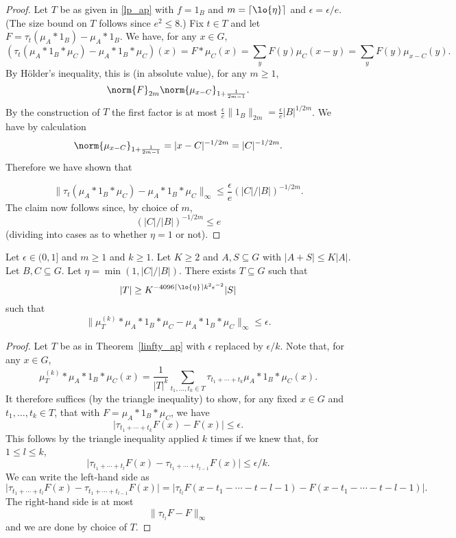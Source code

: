 \begin{proof}
 Let $T$ be as given in \ref{lp_ap}
with $f=1_B$ and $m=\lceil \lo{\eta}\rceil$ and $\epsilon=\epsilon/e$. (The size bound on $T$ follows since $e^2\leq 8$.) Fix $t\in T$ and let $F=\tau_t(\mu_A\ast 1_B)-\mu_A\ast 1_B$. We have, for any $x\in G$,
\[(\tau_t(\mu_A\ast 1_B\ast \mu_C)-\mu_A\ast 1_B\ast \mu_C)(x)=F\ast \mu_C(x)=\sum_y F(y)\mu_{C}(x-y)=\sum_yF(y)\mu_{x-C}(y).\]
By Hölder's inequality, this is (in absolute value), for any $m\geq 1$,
\[\norm{F}_{2m}\norm{\mu_{x-C}}_{1+\frac{1}{2m-1}}.\]
By the construction of $T$ the first factor is at most
$\frac{\epsilon}{e}\| 1_B\|_{2m}=\frac{\epsilon}{e}\lvert B\rvert^{1/2m}$.
We have by calculation
\[\norm{\mu_{x-C}}_{1+\frac{1}{2m-1}}=\lvert x-C\rvert^{-1/2m}=\lvert C\rvert^{-1/2m}.\]
Therefore we have shown that

\[\| \tau_t(\mu_A\ast 1_B\ast \mu_C)-\mu_A\ast 1_B\ast \mu_C\|_{\infty}\leq \frac{\epsilon}{e}(\lvert C\rvert/\lvert B\rvert)^{-1/2m}.\]
The claim now follows since, by choice of $m$,
\[(\lvert C\rvert/\lvert B\rvert)^{-1/2m}\leq e\]
(dividing into cases as to whether $\eta=1$ or not).
\end{proof}


\begin{theorem}
\label{linfty_ap_boosted}

Let $\epsilon\in (0,1]$ and $m\geq 1$ and $k\geq 1$. Let $K\geq 2$ and $A,S\subseteq G$ with $\lvert A+S\rvert\leq K\lvert A\rvert$.
Let $B,C\subseteq G$. Let $\eta=\min(1,\lvert C\rvert/\lvert B\rvert)$. There exists $T\subseteq G$ such that
\[\lvert T\rvert \geq K^{-4096\lceil \lo{\eta}\rceil k^2\epsilon^{-2}}\lvert S\rvert\]
such that
\[\| \mu_T^{(k)}\ast \mu_A\ast 1_B\ast \mu_C-\mu_A\ast 1_B\ast \mu_C\|_{\infty}\leq \epsilon.\]
\end{theorem}

\begin{proof}
Let $T$ be as in Theorem~\ref{linfty_ap} with $\epsilon$ replaced by $\epsilon/k$. Note that, for any $x\in G$,
\[\mu_T^{(k)}\ast \mu_A\ast 1_B\ast \mu_C(x)=\frac{1}{\lvert T\rvert^k}\sum_{t_1,\ldots,t_k\in T}\tau_{t_1+\cdots+t_k}\mu_A\ast 1_B\ast \mu_C(x).\]
It therefore suffices (by the triangle inequality) to show, for any fixed $x\in G$ and $t_1,\ldots,t_k\in T$, that with $F=\mu_A\ast 1_B\ast \mu_C$, we have
\[\lvert \tau_{t_1+\cdots+t_k}F(x)-F(x)\rvert \leq \epsilon.\]
This follows by the triangle inequality applied $k$ times if we knew that, for $1\leq l\leq k$,
\[\lvert \tau_{t_1+\cdots+t_l}F(x)-\tau_{t_1+\cdots+t_{l-1}}F(x)\rvert \leq \epsilon/k.\]
We can write the left-hand side as
\[\lvert \tau_{t_1+\cdots+t_l}F(x)-\tau_{t_1+\cdots+t_{l-1}}F(x)\rvert=\lvert \tau_{t_l}F(x-t_1-\cdots-t-{l-1})-F(x-t_1-\cdots-t-{l-1})\rvert.\]
The right-hand side is at most
\[\| \tau_{t_l}F-F\|_\infty\]
and we are done by choice of $T$.
\end{proof}
